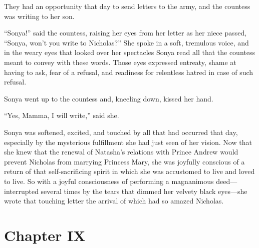 They had an opportunity that day to send letters to the army, and
the countess was writing to her son.

``Sonya!'' said the countess, raising her eyes from her letter as
her niece passed, ``Sonya, won't you write to Nicholas?'' She
spoke in a soft, tremulous voice, and in the weary eyes that
looked over her spectacles Sonya read all that the countess meant
to convey with these words. Those eyes expressed entreaty, shame
at having to ask, fear of a refusal, and readiness for relentless
hatred in case of such refusal.

Sonya went up to the countess and, kneeling down, kissed her
hand.

``Yes, Mamma, I will write,'' said she.

Sonya was softened, excited, and touched by all that had occurred
that day, especially by the mysterious fulfillment she had just
seen of her vision. Now that she knew that the renewal of
Natasha's relations with Prince Andrew would prevent Nicholas
from marrying Princess Mary, she was joyfully conscious of a
return of that self-sacrificing spirit in which she was
accustomed to live and loved to live. So with a joyful
consciousness of performing a magnanimous deed---interrupted
several times by the tears that dimmed her velvety black
eyes---she wrote that touching letter the arrival of which had so
amazed Nicholas.


\chapter*{Chapter IX} \ifaudio {}
\fi

